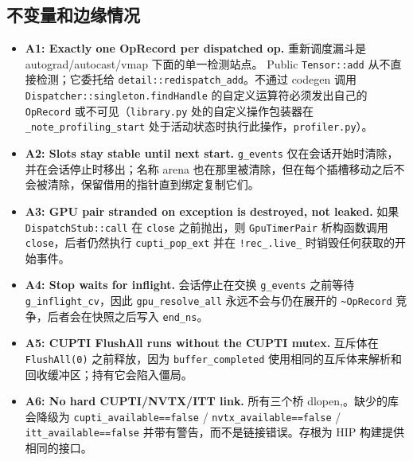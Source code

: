 \subsection{不变量和边缘情况}

\begin{itemize}[leftmargin=1.2em]
\item \textbf{A1: Exactly one OpRecord per dispatched op.} 重新调度漏斗是 autograd/autocast/vmap 下面的单一检测站点。 Public \texttt{Tensor::add} 从不直接检测；它委托给 \texttt{detail::redispatch\_add}。不通过 codegen 调用 \texttt{Dispatcher::singleton.findHandle} 的自定义运算符必须发出自己的 \texttt{OpRecord} 或不可见（\texttt{library.py} 处的自定义操作包装器在 \texttt{\_note\_profiling\_start} 处于活动状态时执行此操作，\texttt{profiler.py}）。
\item \textbf{A2: Slots stay stable until next start.} \texttt{g\_events} 仅在会话开始时清除，并在会话停止时移出；名称 arena 也在那里被清除，但在每个插槽移动之后不会被清除，保留借用的指针直到绑定复制它们。
\item \textbf{A3: GPU pair stranded on exception is destroyed, not leaked.} 如果 \texttt{DispatchStub::call} 在 \texttt{close} 之前抛出，则 \texttt{GpuTimerPair} 析构函数调用 \texttt{close}，后者仍然执行 \texttt{cupti\_pop\_ext} 并在 \texttt{!rec\_.live\_} 时销毁任何获取的开始事件。
\item \textbf{A4: Stop waits for inflight.} 会话停止在交换 \texttt{g\_events} 之前等待 \texttt{g\_inflight\_cv}，因此 \texttt{gpu\_resolve\_all} 永远不会与仍在展开的 \texttt{\textasciitilde OpRecord} 竞争，后者会在快照之后写入 \texttt{end\_ns}。
\item \textbf{A5: CUPTI FlushAll runs without the CUPTI mutex.} 互斥体在 \texttt{FlushAll(0)} 之前释放，因为 \texttt{buffer\_completed} 使用相同的互斥体来解析和回收缓冲区；持有它会陷入僵局。
\item \textbf{A6: No hard CUPTI/NVTX/ITT link.} 所有三个桥 dlopen,。缺少的库会降级为 \texttt{cupti\_available==false} / \texttt{nvtx\_available==false} / \texttt{itt\_available==false} 并带有警告，而不是链接错误。存根为 HIP 构建提供相同的接口。
\end{itemize}

